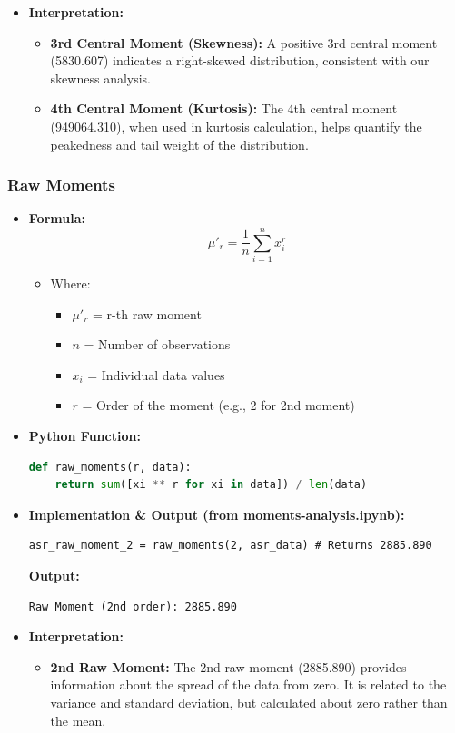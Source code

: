\begin{frame}[fragile]
\begin{itemize}
        \item \textbf{Interpretation:}
        \begin{itemize}
            \item \textbf{3rd Central Moment (Skewness):} A positive 3rd central moment (5830.607) indicates a right-skewed distribution, consistent with our skewness analysis.
            \item \textbf{4th Central Moment (Kurtosis):} The 4th central moment (949064.310), when used in kurtosis calculation, helps quantify the peakedness and tail weight of the distribution.
        \end{itemize}
    \end{itemize}
\end{frame}

\begin{frame}[fragile]
    \frametitle{Raw Moments}
    \begin{itemize}
        \item \textbf{Formula:}
        \[
        \mu'_r = \frac{1}{n} \sum_{i=1}^{n} x_i^r
        \]
        \begin{itemize}
            \item Where:
            \begin{itemize}
                \item $\mu'_r$ = r-th raw moment
                \item $n$ = Number of observations
                \item $x_i$ = Individual data values
                \item $r$ = Order of the moment (e.g., 2 for 2nd moment)
            \end{itemize}
        \end{itemize}

        \item \textbf{Python Function:}
        \begin{lstlisting}[language=Python]
def raw_moments(r, data):
    return sum([xi ** r for xi in data]) / len(data)
        \end{lstlisting}

        \item \textbf{Implementation \& Output (from moments-analysis.ipynb):}
        \begin{lstlisting}
asr_raw_moment_2 = raw_moments(2, asr_data) # Returns 2885.890
        \end{lstlisting}
        \textbf{Output:}
        \begin{verbatim}
Raw Moment (2nd order): 2885.890
        \end{verbatim}

        \item \textbf{Interpretation:}
        \begin{itemize}
            \item \textbf{2nd Raw Moment:} The 2nd raw moment (2885.890) provides information about the spread of the data from zero. It is related to the variance and standard deviation, but calculated about zero rather than the mean.
        \end{itemize}
    \end{itemize}
\end{frame}